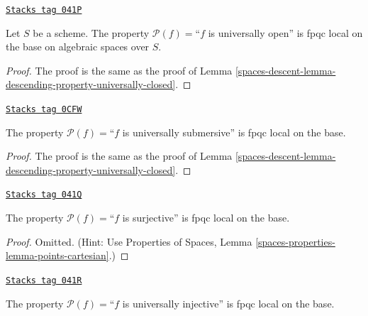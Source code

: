 \begin{lemma}
\label{spaces-descent-lemma-descending-property-universally-open}
\href{https://stacks.math.columbia.edu/tag/041P}{\texttt{Stacks tag 041P}}

Let $S$ be a scheme.
The property $\mathcal{P}(f) =$``$f$ is universally open''
is fpqc local on the base on algebraic spaces over $S$.
\end{lemma}

\begin{proof}
The proof is the same as the proof of
Lemma \ref{spaces-descent-lemma-descending-property-universally-closed}.
\end{proof}

\begin{lemma}
\label{spaces-descent-lemma-descending-property-universally-submersive}
\href{https://stacks.math.columbia.edu/tag/0CFW}{\texttt{Stacks tag 0CFW}}

The property $\mathcal{P}(f) =$``$f$ is universally submersive''
is fpqc local on the base.
\end{lemma}

\begin{proof}
The proof is the same as the proof of
Lemma \ref{spaces-descent-lemma-descending-property-universally-closed}.
\end{proof}

\begin{lemma}
\label{spaces-descent-lemma-descending-property-surjective}
\href{https://stacks.math.columbia.edu/tag/041Q}{\texttt{Stacks tag 041Q}}

The property $\mathcal{P}(f) =$``$f$ is surjective''
is fpqc local on the base.
\end{lemma}

\begin{proof}
Omitted. (Hint: Use
Properties of Spaces, Lemma \ref{spaces-properties-lemma-points-cartesian}.)
\end{proof}

\begin{lemma}
\label{spaces-descent-lemma-descending-property-universally-injective}
\href{https://stacks.math.columbia.edu/tag/041R}{\texttt{Stacks tag 041R}}

The property $\mathcal{P}(f) =$``$f$ is universally injective''
is fpqc local on the base.
\end{lemma}


